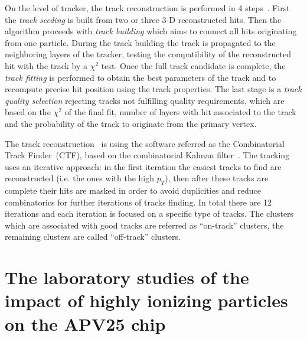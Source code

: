 
On the level of tracker, the track reconstruction is performed in 4 steps~\cite{website:slidesTracking, website:twikiTracking}. First the \textit{track seeding} is built from two or three 3-D reconstructed hits. Then the algorithm proceeds with \textit{track building} which aims to connect all hits originating from one particle. During the track building the track is propagated to the neighboring layers of the tracker, testing the compatibility of the reconstructed hit with the track by a $\chi^{2}$ test. Once the full track candidate is complete, the \textit{track fitting} is performed to obtain the best parameters of the track and to recompute precise hit position using the track properties. The last stage is a \textit{track quality selection} rejecting tracks not fulfilling quality requirements, which are based on the $\chi^{2}$ of the final fit, number of layers with hit associated to the track and the probability of the track  to originate from the primary vertex.

The track reconstruction~\cite{Chatrchyan:2014fea} is using the software referred as the Combinatorial Track Finder~(CTF), based on the combinatorial Kalman filter~\cite{Fruhwirth:1987fm}. The tracking uses an iterative approach: in the first iteration the easiest tracks to find are reconstructed (i.e. the ones with the high $p_{T}$), then after these tracks are complete their hits are masked in order to avoid duplicities and reduce combinatorics for further iterations of tracks finding. In total there are 12 iterations and each iteration is focused on a specific type of tracks. The clusters which are associated with good tracks are referred as ``on-track'' clusters, the remaining clusters are called ``off-track'' clusters.


\section{The laboratory studies of the impact of highly ionizing particles on the APV25 chip}


